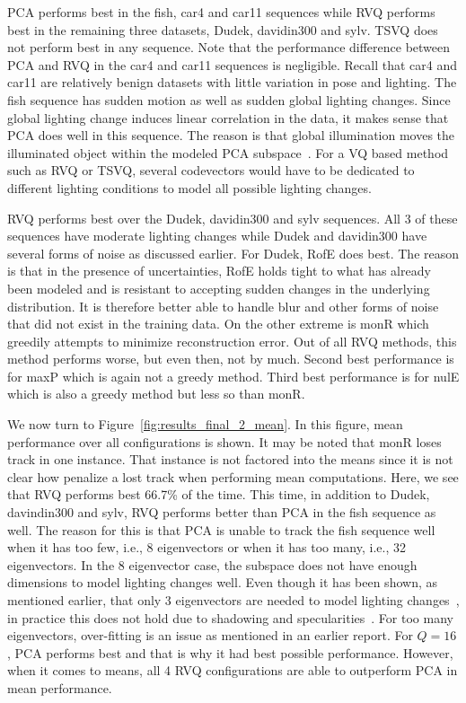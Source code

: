PCA performs best in the fish, car4 and car11 sequences while RVQ performs best in the remaining three datasets, Dudek, davidin300 and sylv.  TSVQ does not perform best in any sequence.  Note that the performance difference between PCA and RVQ in the car4 and car11 sequences is negligible.  Recall that car4 and car11 are relatively benign datasets with little variation in pose and lighting.  The fish sequence has sudden motion as well as sudden global lighting changes.   Since global lighting change induces linear correlation in the data, it makes sense that PCA does well in this sequence.  The reason is that global illumination moves the illuminated object within the modeled PCA subspace~\cite{1987_JNL_Faces_Sirovich}.  For a VQ based method such as RVQ or TSVQ, several codevectors would have to be dedicated to different lighting conditions to model all possible lighting changes.  

RVQ performs best over the Dudek, davidin300 and sylv sequences.  All 3 of these sequences have moderate lighting changes while Dudek and davidin300 have several forms of noise as discussed earlier.  For Dudek, RofE does best.  The reason is that in the presence of uncertainties, RofE holds tight to what has already been modeled and is resistant to accepting sudden changes in the underlying distribution.  It is therefore better able to handle blur and other forms of noise that did not exist in the training data.  On the other extreme is monR which greedily attempts to minimize reconstruction error.  Out of all RVQ methods, this method performs worse, but even then, not by much.  Second best performance is for maxP which is again not a greedy method.  Third best performance is for nulE which is also a greedy method but less so than monR.

We now turn to Figure~\ref{fig:results_final_2_mean}.  In this figure, mean performance over all configurations is shown.  It may be noted that monR loses track in one instance.  That instance is not factored into the means since it is not clear how penalize a lost track when performing mean computations.  Here, we see that RVQ performs best 66.7\% of the time.  This time, in addition to Dudek, davindin300 and sylv, RVQ performs better than PCA in the fish sequence as well.  The reason for this is that PCA is unable to track the fish sequence well when it has too few, i.e., 8 eigenvectors or when it has too many, i.e., 32 eigenvectors.  In the 8 eigenvector case, the subspace does not have enough dimensions to model lighting changes well.  Even though it has been shown, as mentioned earlier, that only 3 eigenvectors are needed to model lighting changes~\cite{1987_JNL_Faces_Sirovich}, in practice this does not hold due to shadowing and specularities~\cite{1997_JNL_EigenVsFisherFaces_Bel}.  For too many eigenvectors, over-fitting is an issue as mentioned in an earlier report.  For $Q=16$, PCA performs best and that is why it had best possible performance.  However, when it comes to means, all 4 RVQ configurations are able to outperform PCA in mean performance.

